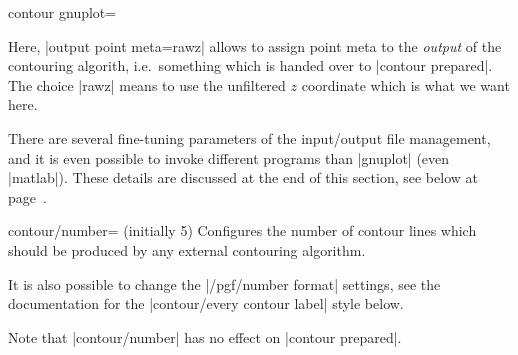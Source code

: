 {{\begin{plottype}[/pgfplots]{contour gnuplot=\textcolor{black}{}}
\begin{codeexample}[]
%
\end{codeexample}
	
	Here, |output point meta=rawz| allows to assign point meta to the \emph{output} of the contouring algorith, i.e.\ something which is handed over to |contour prepared|. The choice |rawz| means to use the unfiltered $z$ coordinate which is what we want here.


	There are several fine-tuning parameters of the input/output file management, and it is even possible to invoke different programs than |gnuplot| (even |matlab|). These details are discussed at the end of this section, see below at page~\pageref{key:pgfplots:contour:gnuplot}.
\end{plottype}

\begin{pgfplotskey}{contour/number= (initially 5)}
	Configures the number of contour lines which should be produced by any external contouring algorithm.	
\pgfplotsexpensiveexample
\begin{codeexample}[]
\end{codeexample}
	It is also possible to change the |/pgf/number format| settings, see the documentation for the |contour/every contour label| style below.


	Note that |contour/number| has no effect on |contour prepared|.
\end{pgfplotskey}

}}
